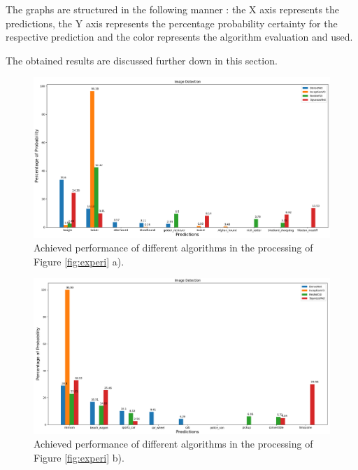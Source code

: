The graphs are structured in the following manner : the X axis represents the predictions, the Y axis represents the percentage probability certainty for the respective prediction and the color represents the algorithm evaluation and used.

The obtained results are discussed further down in this section.

\begin{figure}[H]
  \centering
  \captionsetup{justification=centering}
  \includegraphics[width=\textwidth]{Sections/4InitialWork/4_images/run1_res.png}
  \caption{Achieved performance of different algorithms in the processing of Figure \ref{fig:experi} a).} 
  \label{fig:exp1}
\end{figure}



\begin{figure}[H]
  \centering
  \includegraphics[width=\textwidth]{Sections/4InitialWork/4_images/run3_res.png}
  \caption{Achieved performance of different algorithms in the processing of Figure \ref{fig:experi} b).}
  \label{fig:exp2}
\end{figure}



